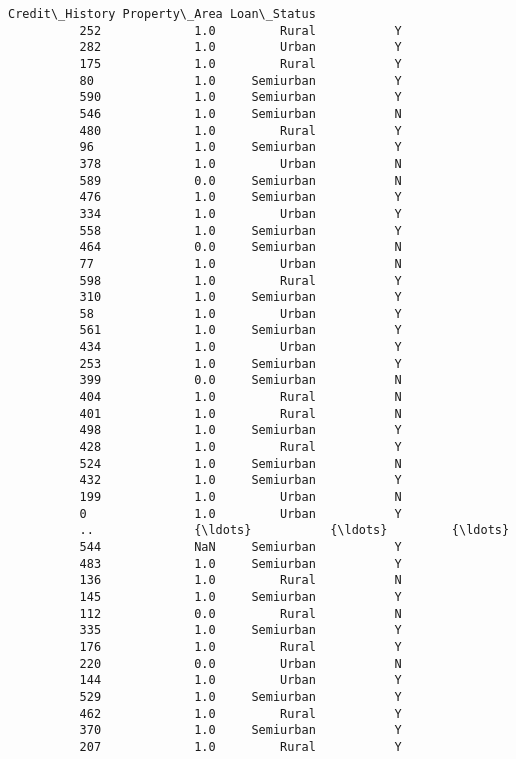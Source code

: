 \documentclass[11pt]{article}
\begin{document}
\begin{Verbatim}[commandchars=\\\{\}]
               Credit\_History Property\_Area Loan\_Status  
          252             1.0         Rural           Y  
          282             1.0         Urban           Y  
          175             1.0         Rural           Y  
          80              1.0     Semiurban           Y  
          590             1.0     Semiurban           Y  
          546             1.0     Semiurban           N  
          480             1.0         Rural           Y  
          96              1.0     Semiurban           Y  
          378             1.0         Urban           N  
          589             0.0     Semiurban           N  
          476             1.0     Semiurban           Y  
          334             1.0         Urban           Y  
          558             1.0     Semiurban           Y  
          464             0.0     Semiurban           N  
          77              1.0         Urban           N  
          598             1.0         Rural           Y  
          310             1.0     Semiurban           Y  
          58              1.0         Urban           Y  
          561             1.0     Semiurban           Y  
          434             1.0         Urban           Y  
          253             1.0     Semiurban           Y  
          399             0.0     Semiurban           N  
          404             1.0         Rural           N  
          401             1.0         Rural           N  
          498             1.0     Semiurban           Y  
          428             1.0         Rural           Y  
          524             1.0     Semiurban           N  
          432             1.0     Semiurban           Y  
          199             1.0         Urban           N  
          0               1.0         Urban           Y  
          ..              {\ldots}           {\ldots}         {\ldots}  
          544             NaN     Semiurban           Y  
          483             1.0     Semiurban           Y  
          136             1.0         Rural           N  
          145             1.0     Semiurban           Y  
          112             0.0         Rural           N  
          335             1.0     Semiurban           Y  
          176             1.0         Rural           Y  
          220             0.0         Urban           N  
          144             1.0         Urban           Y  
          529             1.0     Semiurban           Y  
          462             1.0         Rural           Y  
          370             1.0     Semiurban           Y  
          207             1.0         Rural           Y  

\end{Verbatim}
\end{document}
